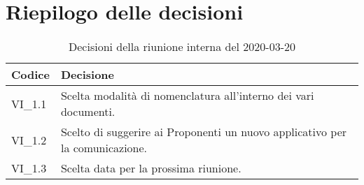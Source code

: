 \section{Riepilogo delle decisioni}
\begin{longtable}{ 
	 >{\centering}p{} >{}p{} }
	
	\caption{Decisioni della riunione interna del 2020-03-20}\\	
	
	\textbf{\color{white}Codice} & 
	\textbf{\color{white}Decisione} 
	\tabularnewline  
	\endhead
	
	VI\_1.1 & Scelta modalità di nomenclatura all'interno dei vari documenti. \\
	VI\_1.2 & Scelto di suggerire ai Proponenti un nuovo applicativo per la comunicazione. \\
	VI\_1.3 & Scelta data per la prossima riunione. \\
	
\end{longtable}